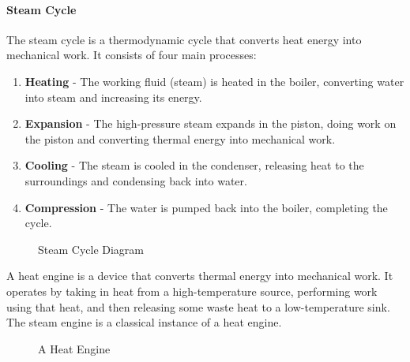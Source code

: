 \documentclass[11pt]{report}
\begin{document}
\paragraph{Steam Cycle} The steam cycle is a thermodynamic cycle that converts heat energy into mechanical work. It consists of four main processes: 
\begin{enumerate}
    \item \textbf{Heating} - The working fluid (steam) is heated in the boiler, converting water into steam and increasing its energy.
    \item \textbf{Expansion} - The high-pressure steam expands in the piston, doing work on the piston and converting thermal energy into mechanical work.
    \item \textbf{Cooling} - The steam is cooled in the condenser, releasing heat to the surroundings and condensing back into water.
    \item \textbf{Compression} - The water is pumped back into the boiler, completing the cycle.
\end{enumerate}

\begin{figure}[h!]
    \centering
    \caption{Steam Cycle Diagram}
\end{figure}

\begin{definition}
    A heat engine is a device that converts thermal energy into mechanical work. It operates by taking in heat from a high-temperature source, performing work using that heat, and then releasing some waste heat to a low-temperature sink. The steam engine is a classical instance of a heat engine.
\end{definition}
\begin{figure}[h!]
    \centering
    \caption{A Heat Engine}
\end{figure}
\end{document}
